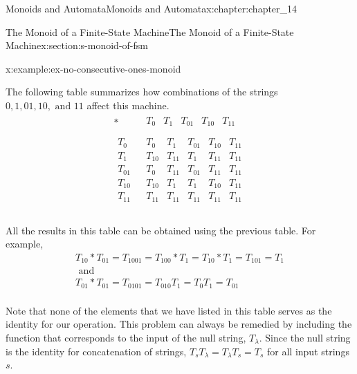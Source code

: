 \documentclass[twoside,10pt,]{book}
\numberwithin{equation}{section}
\begin{document}
\begin{chapterptx}{Monoids and Automata}{}{Monoids and Automata}{}{}{x:chapter:chapter_14}
\begin{sectionptx}{The Monoid of a Finite-State Machine}{}{The Monoid of a Finite-State Machine}{}{}{x:section:s-monoid-of-fsm}
\begin{example}{}{x:example:ex-no-consecutive-ones-monoid}
\par
The following table summarizes how combinations of the strings \(0,1,01,10, \textrm{ and } 11\) affect this machine.%
\begin{equation*}
\begin{array}{c|c}
* & 
\begin{array}{ccccc}
T_0 & T_1 & T_{01} & T_{10} & T_{11} \\
\end{array}
\\
\hline
\begin{array}{c}
T_0 \\
T_1 \\
T_{01} \\
T_{10} \\
T_{11} \\
\end{array}
& 
\begin{array}{ccccc}
T_0 & T_1 & T_{01} & T_{10} & T_{11} \\
T_{10} & T_{11} & T_1 & T_{11} & T_{11} \\
T_0 & T_{11} & T_{01} & T_{11} & T_{11} \\
T_{10} & T_1 & T_1 & T_{10} & T_{11} \\
T_{11} & T_{11} & T_{11} & T_{11} & T_{11} \\
\end{array}
\\
\end{array}
\end{equation*}
%
\par
All the results in this table can be obtained using the previous table. For example,%
\begin{equation*}
\begin{array}{c}
T_{10}*T_{01}=T_{1001}=T_{100}*T_1=T_{10}*T_1=T_{101}=T_1\\
\textrm{ and} \\
T_{01}*T_{01}=T_{0101}=T_{010}T_1=T_0T_1=T_{01}\\
\end{array}
\end{equation*}
%
\par
Note that none of the elements that we have listed in this table serves as the identity for our operation. This problem can always be remedied by including the function that corresponds to the input of the null string, \(T_{\lambda }\). Since the null string is the identity for concatenation of strings, \(T_sT_{\lambda }=T_{\lambda }T_s=T_s\) for all input strings \(s\).%
\end{example}

\end{sectionptx}
\end{chapterptx}
\end{document}
